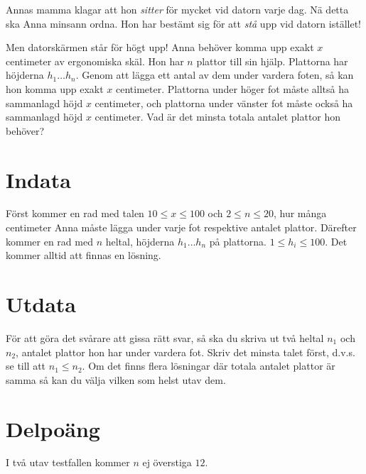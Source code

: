 Annas mamma klagar att hon \emph{sitter} för mycket vid datorn varje
dag. Nä detta ska Anna minsann ordna. Hon har bestämt sig för att
\emph{stå} upp vid datorn istället!

Men datorskärmen står för högt upp! Anna behöver komma upp exakt
$x$ centimeter av ergonomiska skäl. Hon har $n$ plattor till sin
hjälp. Plattorna har höjderna $h_1 \dots h_n$. Genom att lägga
ett antal av dem under vardera foten, så kan hon komma upp exakt $x$ centimeter.
Plattorna under höger fot måste alltså ha sammanlagd höjd $x$ centimeter, och plattorna under vänster fot måste
också ha sammanlagd höjd $x$ centimeter. Vad är det minsta totala antalet plattor hon behöver?

\section*{Indata}

Först kommer en rad med talen $10 \leq x \leq 100$ och $2 \leq n \leq
20$, hur många centimeter Anna måste lägga under varje fot respektive
antalet plattor. Därefter kommer en rad med $n$ heltal, höjderna $h_1
\dots h_n$ på plattorna. $1 \leq h_i \leq 100$. Det kommer alltid att
finnas en lösning.

\section*{Utdata}

För att göra det svårare att gissa rätt svar, så ska du skriva
ut två heltal $n_1$ och $n_2$, antalet plattor hon har under vardera fot. Skriv det minsta talet först, d.v.s. se till att $n_1\leq n_2$. Om det finns flera lösningar där
totala antalet plattor är samma så kan du välja vilken som helst utav dem.


\section*{Delpoäng}

I två utav testfallen kommer $n$ ej överstiga $12$.
